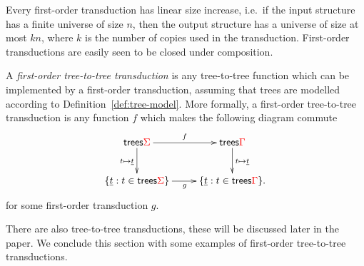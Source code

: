 Every first-order  transduction has linear size increase, i.e.~if the input structure has a finite universe of size $n$, then the output structure has a universe of size at most $kn$, where $k$ is the number of copies used in the transduction. First-order transductions are easily seen to be closed under composition.

\begin{definition}
    A \emph{first-order tree-to-tree transduction} is any tree-to-tree  function which can be implemented by a first-order transduction, assuming that trees are modelled according to Definition~\ref{def:tree-model}. More formally, a first-order tree-to-tree transduction is any function $f$ which makes the following diagram commute
    \begin{align*}
        \xymatrix{
            \trees \rSigma \ar[d]_{t \mapsto \underline t}\ar[r]^f & \trees \rGamma \ar[d]^{t \mapsto \underline t} \\
            \set{\underline t : t \in \trees \rSigma} \ar[r]_g & \set{\underline t : t \in \trees \rGamma}.
        } 
    \end{align*}
for some first-order transduction $g$.     
\end{definition}


There are also \mso tree-to-tree transductions, these will be discussed later in the paper.  We conclude this section with some examples of first-order tree-to-tree transductions.

